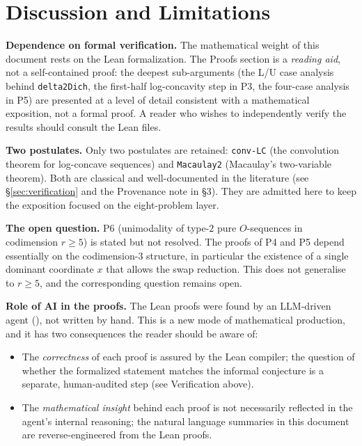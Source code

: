 \documentclass[11pt,reqno]{amsart}
\begin{document}
\section{Discussion and Limitations}

\noindent\textbf{Dependence on formal verification.} The mathematical weight
of this document rests on the Lean formalization. The Proofs section is a 
\emph{reading aid}, not a self-contained proof: the deepest sub-arguments
(the L/U case analysis behind \texttt{delta2Dich}, the first-half
log-concavity step in P3, the four-case analysis in P5) are presented at a
level of detail consistent with a mathematical exposition, not a formal
proof. A reader who wishes to independently verify the results should
consult the Lean files.

\medskip\noindent\textbf{Two postulates.} Only two postulates are retained: 
\texttt{conv-LC} (the convolution theorem for log-concave sequences) and 
\texttt{Macaulay2} (Macaulay's two-variable theorem). Both are classical and
well-documented in the literature (see \S \ref{sec:verification} and the
Provenance note in \S 3). They are admitted here to keep the exposition
focused on the eight-problem layer.

\medskip\noindent\textbf{The open question.} P6 (unimodality of type-$2$
pure $O$-sequences in codimension $r \ge 5$) is stated but not resolved. The
proofs of P4 and P5 depend essentially on the codimension-$3$ structure, in
particular the existence of a single dominant coordinate $x$ that allows the
swap reduction. This does not generalise to $r \ge 5$, and the corresponding
question remains open.

\medskip\noindent\textbf{Role of AI in the proofs.} The Lean proofs were
found by an LLM-driven agent (\cite{tsoukalas2026}), not written by hand.
This is a new mode of mathematical production, and it has two consequences
the reader should be aware of:

\begin{itemize}
\item The \emph{correctness} of each proof is assured by the Lean compiler;
the question of whether the formalized statement matches the informal
conjecture is a separate, human-audited step (see Verification above).

\item The \emph{mathematical insight} behind each proof is not necessarily
reflected in the agent's internal reasoning; the natural language summaries
in this document are reverse-engineered from the Lean proofs.
\end{itemize}
\end{document}
